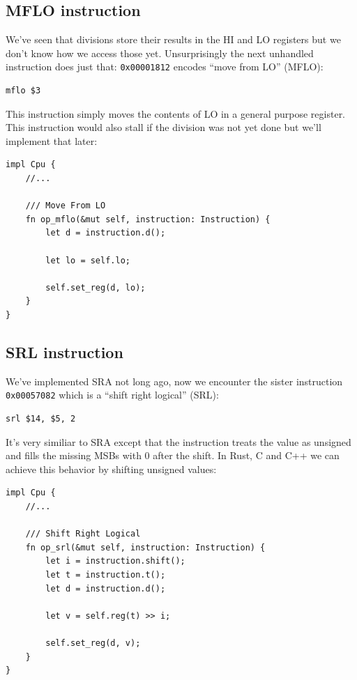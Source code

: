 \documentclass[a4paper]{article}
\newcommand{\code}[1] {\texttt{#1}}
\begin{document}
\subsection{MFLO instruction}

We've seen that divisions store their results in the HI and LO
registers but we don't know how we access those yet. Unsurprisingly
the next unhandled instruction does just that: \code{0x00001812} encodes
``move from LO'' (MFLO):

\begin{lstlisting}[language=assembly]
mflo $3
\end{lstlisting}

This instruction simply moves the contents of LO in a general purpose
register. This instruction would also stall if the division was not
yet done but we'll implement that later:

\begin{lstlisting}
impl Cpu {
    //...

    /// Move From LO
    fn op_mflo(&mut self, instruction: Instruction) {
        let d = instruction.d();

        let lo = self.lo;

        self.set_reg(d, lo);
    }
}
\end{lstlisting}

\subsection{SRL instruction}

We've implemented SRA not long ago, now we encounter the sister
instruction \code{0x00057082} which is a ``shift right logical''
(SRL):

\begin{lstlisting}[language=assembly]
srl $14, $5, 2
\end{lstlisting}

It's very similiar to SRA except that the instruction treats the value
as unsigned and fills the missing MSBs with 0 after the shift. In
Rust, C and C++ we can achieve this behavior by shifting unsigned
values:

\begin{lstlisting}
impl Cpu {
    //...

    /// Shift Right Logical
    fn op_srl(&mut self, instruction: Instruction) {
        let i = instruction.shift();
        let t = instruction.t();
        let d = instruction.d();

        let v = self.reg(t) >> i;

        self.set_reg(d, v);
    }
}
\end{lstlisting}
\end{document}
